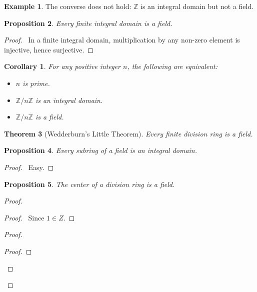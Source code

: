 \documentclass{book}
\let\qed\relax
\newtheorem{prop}{Proposition}[chapter]
\newtheorem{thm}[prop]{Theorem}
\newtheorem{cor}{Corollary}[prop]
\theoremstyle{definition}
\newtheorem{ex}[prop]{Example}
\newcommand{\inv}[1]{\ensuremath{{#1}^{-1}}}
\begin{document}
\begin{ex}
The converse does not hold: $\mathbb{Z}$ is an integral domain but not a field.
\end{ex}

\begin{prop}
Every finite integral domain is a field.
\end{prop}

\begin{proof}
\pf\ In a finite integral domain, multiplication by any non-zero element is injective, hence surjective. \qed
\end{proof}

\begin{cor}
For any positive integer $n$, the following are equivalent:
\begin{itemize}
\item $n$ is prime.
\item $\mathbb{Z} / n \mathbb{Z}$ is an integral domain.
\item $\mathbb{Z} / n \mathbb{Z}$ is a field.
\end{itemize}
\end{cor}

\begin{thm}[Wedderburn's Little Theorem]
Every finite division ring is a field.
\end{thm}


\begin{prop}
Every subring of a field is an integral domain.
\end{prop}

\begin{proof}
\pf\ Easy. \qed
\end{proof}

\begin{prop}
The center of a division ring is a field.
\end{prop}

\begin{proof}
\pf
{}
\begin{proof}
\pf\ Since $1 \in Z$.
\end{proof}
\begin{proof}
	\step{b}{$\inv{a} \in Z$}
	\begin{proof}
		\step{iii}{$x \inv{a} = \inv{a} x$}
	\end{proof}
\end{proof}
\qed
\end{proof}
\end{document}
